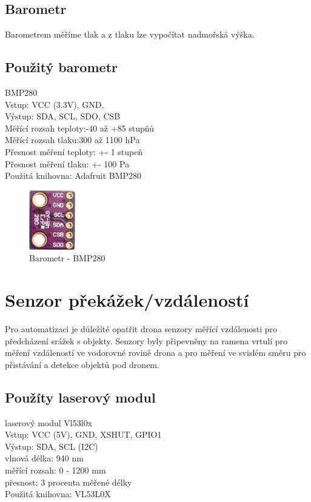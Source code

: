 \subsection{Barometr}
Barometrem měříme tlak a z tlaku lze vypočítat nadmořská výška.

\subsection{Použitý barometr}
BMP280\\
Vstup: VCC (3.3V), GND,\\
Výstup: SDA, SCL, SDO, CSB\\
Měřící rozsah teploty:-40 až +85 stupňů\\
Měřící rozsah tlaku:300 až 1100 hPa\\
Přesnost měření teploty: +- 1 stupeň\\
Přesnost měření tlaku:  +- 100 Pa\\
Použitá knihovna: Adafruit BMP280\\

\begin{figure}[h]
	\centering
	\includegraphics[width=2cm]{pictures/baro.jpg}
	\caption{Barometr - BMP280}
\end{figure}

\section{Senzor překážek/vzdáleností}
Pro automatizaci je důležíté opatřit drona senzory měřící vzdálenosti pro předcházení srážek s objekty. Senzory byly připevněny na ramena vrtulí pro měření vzdáleností ve vodorovné rovině drona a pro měření ve svislém směru pro přistávání a detekce objektů pod dronem.

\subsection{Použíty laserový modul}
laserový modul Vl53l0x\\
Vstup: VCC (5V), GND, XSHUT, GPIO1\\
Výstup: SDA, SCL (I2C)\\
vlnová délka: 940 nm\\
měřící rozsah: 0 - 1200 mm\\
přesnost: 3 procenta měřené délky\\
Použitá knihovna: VL53L0X\\

